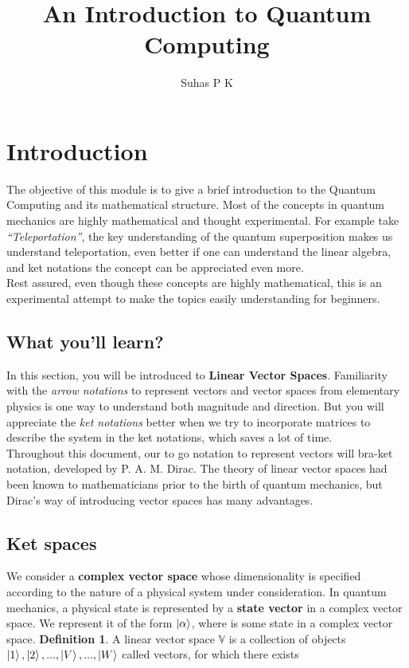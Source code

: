 \documentclass{article}
\title{An Introduction to Quantum Computing}
\author{Suhas P K}
\affil{Department of Physics,\\ AMCEC}
\date{}
\begin{document}
\maketitle
\newpage


\newpage
\tableofcontents
\newpage


\section{\textbf{Introduction}}
\label{sec:Introduction}
The objective of this module is to give a brief introduction to the Quantum Computing and its mathematical structure. Most of the concepts in quantum mechanics are highly mathematical and thought experimental. For example take \textit{“Teleportation”}, the key understanding of the quantum superposition makes us understand teleportation, even better if one can understand the linear algebra, and ket notations the concept can be appreciated even more. \\
Rest assured, even though these concepts are highly mathematical, this is an experimental attempt to make the topics easily understanding for beginners.

\subsection{What you'll learn?}
\label{subsec:What you'll learn?}
In this section, you will be introduced to \textbf{Linear Vector Spaces}. Familiarity with the \textit{arrow notations} to represent vectors and vector spaces from elementary physics is one way to understand both magnitude and direction. But you will appreciate the \textit{ket notations} better when we try to incorporate matrices to describe the system in the ket notations, which saves a lot of time.\\
Throughout this document, our to go notation to represent vectors will bra-ket notation, developed by P. A. M. Dirac. The theory of linear vector spaces had been known to mathematicians prior to the birth of quantum mechanics, but Dirac's way of introducing vector spaces has many advantages.
\subsection{Ket spaces}
\label{subsec:Ket spaces}
We consider a \textbf{complex vector space} whose dimensionality is specified according to the nature of a physical system under consideration. In quantum mechanics, a physical state is represented by a \textbf{state vector} in a complex vector space. We represent it of the form
$\ket{\alpha}$, where is some state in a complex vector space.
\newpage
\textbf{Definition 1}. A linear vector space $\mathbb{V}$ is a collection of objects $\ket{1},\ket{2},...,\ket{V},...,\ket{W}$ called vectors, for which there exists
\end{document}
